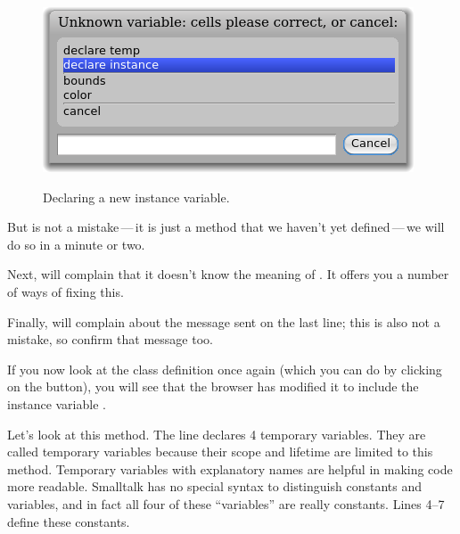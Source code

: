 \documentclass[a4paper,10pt,twoside]{book}
\begin{document}
\begin{figure}[htb]
\begin{minipage}{0.48\textwidth}
		{\includegraphics[scale=0.7]{DeclareInstanceVar}}
	\caption{Declaring a new instance variable.\label{fig:declareInstance}}
\end{minipage}
\end{figure}

But  is not a mistake\,---\,it is just a method that we haven't yet defined\,---\,we will do so in a minute or two.


Next, \pharo will complain that it doesn't know the meaning of .  It offers you a number of ways of fixing this.

Finally, \pharo will complain about the message  sent on the last line; this is also not a mistake, so confirm that message too.

If you now look at the class definition once again (which you can do by clicking on the  button), you will see that the browser has modified it to include the instance variable .

Let's look at this  method.
The line   declares 4 temporary variables. They are called temporary variables because their scope and lifetime are limited to this method.  Temporary variables with explanatory names are helpful in making code more readable.  Smalltalk has no special syntax to distinguish constants and variables, and in fact all four of these ``variables'' are really constants. 
Lines 4--7 define these constants.
\end{document}
